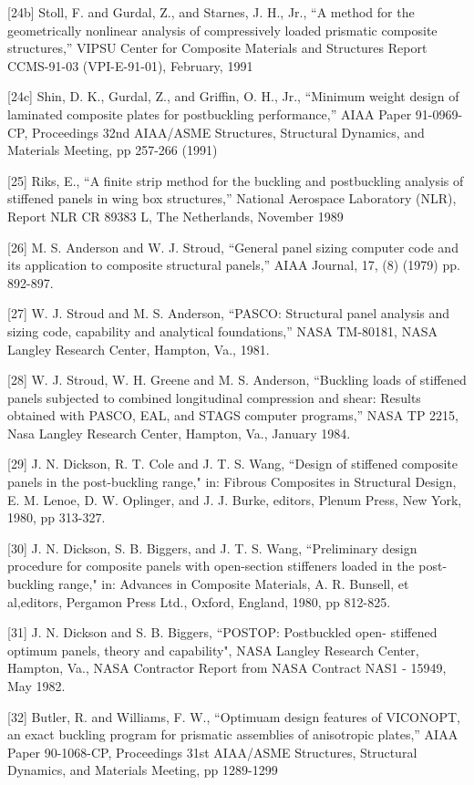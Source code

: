 [24b] Stoll, F. and Gurdal, Z., and Starnes, J. H., Jr., ``A method for
the geometrically nonlinear analysis of compressively loaded prismatic
composite structures,'' VIPSU Center for Composite Materials and
Structures Report CCMS-91-03 (VPI-E-91-01), February, 1991

[24c] Shin, D. K., Gurdal, Z., and Griffin, O. H., Jr., ``Minimum
weight design of laminated composite plates for postbuckling
performance,'' AIAA Paper 91-0969-CP, Proceedings 32nd AIAA/ASME
Structures, Structural Dynamics, and Materials Meeting, pp 257-266 (1991)

[25] Riks, E., ``A finite strip method for the buckling and
postbuckling analysis of stiffened panels in wing box structures,''
National Aerospace Laboratory (NLR), Report NLR CR 89383 L, The
Netherlands, November 1989

[26] M. S. Anderson and W. J. Stroud, ``General panel sizing computer
code and its application to composite structural panels,'' AIAA
Journal, 17, (8) (1979) pp. 892-897. 

[27] W. J. Stroud and M. S. Anderson, ``PASCO: Structural panel
analysis and sizing code, capability and analytical foundations,''
NASA TM-80181, NASA Langley Research Center, Hampton, Va., 1981. 

[28] W. J. Stroud, W. H. Greene and M. S. Anderson, ``Buckling loads
of stiffened panels subjected to combined longitudinal compression
and shear: Results obtained with PASCO, EAL, and STAGS computer
programs,'' NASA TP 2215, Nasa Langley Research Center, Hampton, Va.,
January 1984. 

[29] J. N. Dickson, R. T. Cole and J. T. S. Wang, ``Design of
stiffened composite panels in the post-buckling range," in: Fibrous
Composites in Structural Design, E. M. Lenoe, D. W. Oplinger, and J.
J. Burke, editors, Plenum Press, New York, 1980, pp 313-327. 

[30] J. N. Dickson, S. B. Biggers, and J. T. S. Wang, ``Preliminary
design procedure for composite panels with open-section stiffeners
loaded in the post-buckling range," in:  Advances in Composite
Materials, A. R. Bunsell, et al,editors, Pergamon Press Ltd., Oxford,
England, 1980, pp 812-825. 

[31] J. N. Dickson and S. B. Biggers, ``POSTOP: Postbuckled open-
stiffened optimum panels, theory and capability", NASA Langley
Research Center, Hampton, Va., NASA Contractor Report from NASA
Contract NAS1 - 15949, May 1982. 

[32] Butler, R. and Williams, F. W., ``Optimuam design features
of VICONOPT, an exact buckling program for prismatic assemblies of
anisotropic plates,''  AIAA Paper 90-1068-CP, 
Proceedings 31st AIAA/ASME Structures, Structural Dynamics,
and Materials Meeting, pp 1289-1299

